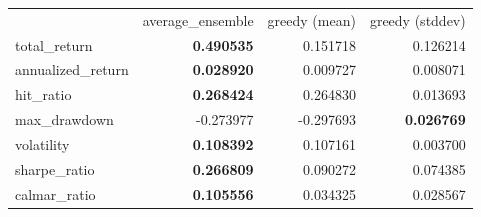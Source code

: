 \begin{tabular}{lrrr}
 & average_ensemble & greedy (mean) & greedy (stddev) \\
total_return & \bfseries 0.490535 & 0.151718 & 0.126214 \\
annualized_return & \bfseries 0.028920 & 0.009727 & 0.008071 \\
hit_ratio & \bfseries 0.268424 & 0.264830 & 0.013693 \\
max_drawdown & -0.273977 & -0.297693 & \bfseries 0.026769 \\
volatility & \bfseries 0.108392 & 0.107161 & 0.003700 \\
sharpe_ratio & \bfseries 0.266809 & 0.090272 & 0.074385 \\
calmar_ratio & \bfseries 0.105556 & 0.034325 & 0.028567 \\
\end{tabular}
